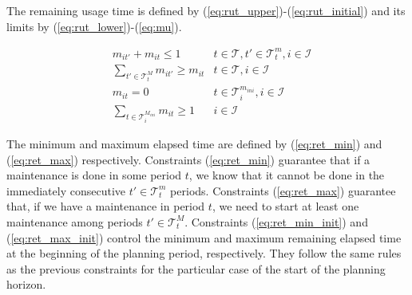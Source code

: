\documentclass[a4paper,onecolumn,fleqn]{article}
\begin{document}
    The remaining usage time is defined by (\ref{eq:rut_upper})-(\ref{eq:rut_initial}) and its limits by (\ref{eq:rut_lower})-(\ref{eq:mu}). 

    \begin{align}
        & m_{it'} + m_{it} \leq 1
          & t \in \mathcal{T}, t' \in \mathcal{T}^{m}_t, i \in \mathcal{I}\label{eq:ret_min}\\ 
        & \sum_{t' \in \mathcal{T}^{M}_t} m_{it'} \geq  m_{it}
          & t \in \mathcal{T}, i \in \mathcal{I}\label{eq:ret_max}\\
        & m_{it} = 0
          & t \in \mathcal{T}^{m_{ini}}_i, i \in \mathcal{I}\label{eq:ret_min_init} \\
        & \sum_{t \in \mathcal{T}^{M_{ini}}_i} m_{it} \geq  1 
          & i \in \mathcal{I}\label{eq:ret_max_init}
    \end{align}

    The minimum and maximum elapsed time are defined by (\ref{eq:ret_min}) and (\ref{eq:ret_max}) respectively. Constraints (\ref{eq:ret_min}) guarantee that if a maintenance is done in some period $t$, we know that it cannot be done in the immediately consecutive $t' \in \mathcal{T}^{m}_t$ periods. Constraints (\ref{eq:ret_max}) guarantee that, if we have a maintenance in period $t$, we need to start at least one maintenance among periods $t' \in \mathcal{T}^{M}_t$. Constraints (\ref{eq:ret_min_init}) and (\ref{eq:ret_max_init}) control the minimum and maximum remaining elapsed time at the beginning of the planning period, respectively. They follow the same rules as the previous constraints for the particular case of the start of the planning horizon.

\end{document}
